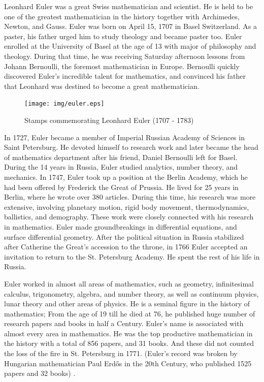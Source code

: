 \documentclass{article}
\begin{document}
\vspace{5mm}


Leonhard Euler was a great Swiss mathematician and scientist. He is held to be one of the greatest mathematician in the history together with Archimedes, Newton, and Gauss. Euler was born on April 15, 1707 in Basel Switzerland. As a paster, his father urged him to study theology and became paster too. Euler enrolled at the University of Basel at the age of 13 with major of philosophy and theology. During that time, he was receiving Saturday afternoon lessons from Johann Bernoulli, the foremost mathematician in Europe. Bernoulli quickly discovered Euler's incredible talent for mathematics, and convinced his father that Leonhard was destined to become a great mathematician.

\begin{figure}[htbp]
 \centering
 \texttt{[image: img/euler.eps]}
 \captionsetup{labelformat=empty}
 \caption{Stamps commemorating Leonhard Euler (1707 - 1783)}
 \label{fig:Leonhard-Euler}
\end{figure}

In 1727, Euler became a member of Imperial Russian Academy of Sciences in Saint Petersburg. He devoted himself to research work and later became the head of mathematics department after his friend, Daniel Bernoulli left for Basel. During the 14 years in Russia, Euler studied analytics, number theory, and mechanics. In 1747, Euler took up a position at the Berlin Academy, which he had been offered by Frederick the Great of Prussia. He lived for 25 years in Berlin, where he wrote over 380 articles. During this time, his research was more extensive, involving planetary motion, rigid body movement, thermodynamics, ballistics, and demography. These work were closely connected with his research in mathematics. Euler made groundbreakings in differential equations, and surface differential geometry. After the political situation in Russia stabilized after Catherine the Great's accession to the throne, in 1766 Euler accepted an invitation to return to the St. Petersburg Academy. He spent the rest of his life in Russia.

Euler worked in almost all areas of mathematics, such as geometry, infinitesimal calculus, trigonometry, algebra, and number theory, as well as continuum physics, lunar theory and other areas of physics. He is a seminal figure in the history of mathematics; From the age of 19 till he died at 76, he published huge number of research papers and books in half a Century. Euler's name is associated with almost every area in mathematics. He was the top productive mathematician in the history with a total of 856 papers, and 31 books. And these did not counted the loss of the fire in St. Petersburg in 1771. (Euler's record was broken by Hungarian mathematician Paul Erdős in the 20th Century, who published 1525 papers and 32 books) \cite{Wiki-Euler}.
\end{document}
